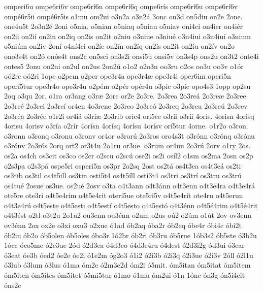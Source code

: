 {omperi6u
ompe6ri6v
ompe6r^^ed6n
ompe6r^^ed6q
ompe6r^^eds
ompe6r^^ed6u
ompe6r^^ed6v
omp^^e96r5ii
omp^^e96r5is
o1mu
om2ui
o3n2a
o3n2^^e1
3onc
on3d
on5diu
on2e
2one.
one4u5t
2o3n2^^e9
2oni
o5nia.
o5nian
o5niaq
o5niau
o5niav
oni4ci
on4ier
on4i^^e9r
on2ii
on2i^^ed
on2in
on2iq
on2is
on2it
o2niu
o3niue
o3niu^^e9
o3n4iui
o3n4iu^^ed
o3nium
o5ni^^fam
on2iv
2on^^ed
o4n^^ed4ci
on2^^ede
on2^^edn
on2^^edq
on2^^eds
on2^^edt
on2^^edu
on2^^edv
on2o
ono3s4t
on2^^f3
on^^f3s4t
ons2c
on5sci
on3s2i
onsi5u
onsi5v
on3s4p
ons2u
on3t2
onte4i
ontes5
2onu
on2ui
on2ul
on2us
2on2^^fa
o1o2
o2o3n
oo3ru
o2os
oo3u
oo3v
o1^^f3r
o^^f32re
o^^f32ri
1ope
o2pem
o2per
ope3r4a
ope3r4^^e6
ope3r4i
oper6im
operi5n
oper^^ed5tur
ope3r4o
ope3r4u
o2p^^e9m
o2p^^e9r
op^^e9r4u
o3pic
o3p^^edc
opo4s3
1opp
op2su
2oq
o3qu
2or.
o1ra
or3ang
o3r^^e6
2orc
or2e
2o3re.
2o3rea
2o3re^^e1
2o3re^^e6
2o3ree
2o3re^^e9
2o3rei
2o3re^^ed
or4en
4o3rene
2o3reo
2o3re^^f3
2o3req
2o3reu
2o3re^^fa
2o3rev
2o3r^^e9a
2o3r^^e9e
o1r2i
or4i^^e1
o3ri^^e6
2o3rib
oric4
ori5ce
o3rii
o3ri^^ed
4oris.
4orisn
4orisq
4orisu
4orisv
o3r^^eda
o2r^^edr
4or^^edsn
4or^^edsq
4or^^edsu
4or^^edsv
or^^ed5tur
4orne.
o1r2o
o3ron.
o3ronn
o3ronq
o3ronu
o3ronv
or4or
o3ror^^fa
2o3ros
oro4s3t
o3r^^f3nn
o3r^^f3nq
o3r^^f3nu
o3r^^f3nv
2o3r^^f3s
2orq
ort2
or3t4u
2o1ru
or3ue.
o3rum
or4un
2o3r^^fa
2orv
o1ry
2os.
os2a
os4ch
os3cit
os3co
os2cr
o2scu
o2sc^^fa
ose2i
os2i
os^^edl2
o1sm
os2ma
2osn
os2p
o2s3pa
o2s3p^^e1
ospe5ri
osperi5n
os3pr
2o2sq
2ost
os2t^^e1
os4t3ea
os4t3e^^e1
os2ti
os3tib
os3til
os4t5ill
os3tin
osti5t4
os4t5^^edll
ost^^ed3t4
os3tri
os3tr^^ed
os3tru
os3tr^^fa
os4tu^^e9
2osue
os3ue.
os2u^^e9
2osv
o3ta
o4t3ann
o4t3^^e1nn
o4t3enn
o4t3e4ra
o4t3e4r^^e1
ote5re
ote3ri
o4t5e4rim
o4t5e4rit
oteri5ue
ote5ri5v
o4t5e4r^^edt
ote4ru
o4t5erun
o4t3e4r^^fa
o4t5este
o4t5esti
o4t5est^^ed
o4t5esto
o4t5est^^f3
o4t3^^e9nn
o4t5^^e94rim
o4t5^^e94rit
o4t3^^e9st
o2tl
o3t2u
2o1u2
ou3enn
ou3^^e9nn
o2um
o2us
o^^fa2
o2^^fam
o1^^fat
2ov
ov3enn
ov3^^e9nn
2ox
ox2e
o3xi
oxu3
o2xue
^^f31ad
^^f3b2aq
^^f3ba2r
^^f3b2eq
^^f3be4r
^^f3bi4c
^^f3bi2t
^^f3b2iu
^^f3b2o
^^f3b5olen
^^f3b5oles
^^f3bo3r
1^^f32br
^^f3b2ri
^^f3b3ru
^^f3b5rue
1^^f3b3s2
^^f3b5ste
^^f33b2u
1^^f3cc
^^f3co5me
^^f32c3ue
2^^f3d
^^f32d3ea
^^f34d3eo
^^f34d3e4ru
^^f34dest
^^f32d3i2g
^^f3d3ui
^^f33ear
^^f33eat
^^f3e3b
^^f3ed2
^^f3e2e
^^f3e2i
^^f31e2m
^^f3g2o3
^^f31i2
^^f32i3b
^^f32i3q
^^f32i3ue
^^f32i3v
2^^f3ll
^^f32l1u
^^f33lub
^^f33lum
^^f33lus
^^f31ma
^^f3m2e
^^f32m3e2d
^^f3m2i
^^f35mit.
^^f3m5itan
^^f3m5itat
^^f3m5item
^^f3m5iten
^^f3m5ites
^^f3m5itet
^^f35mi5tur
^^f31mo
^^f31mu
^^f3m2ui
^^f31n
1^^f3nc
^^f3n3g
^^f3n5i4cit
^^f3ns2c
}
